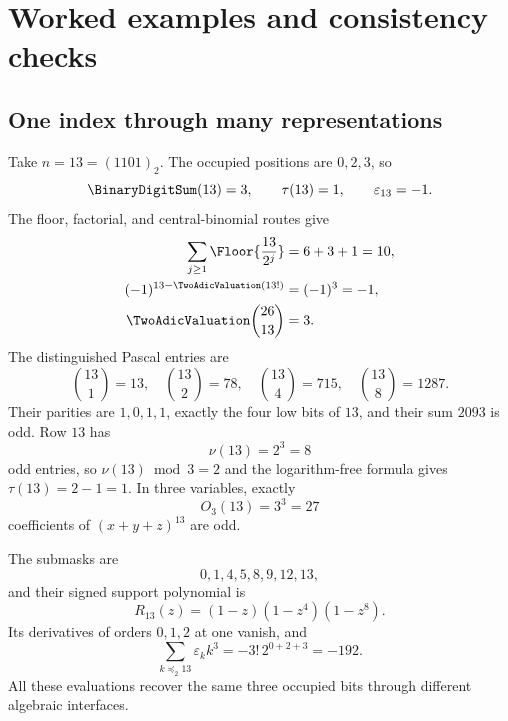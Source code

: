 \documentclass[11pt,oneside]{article}
\numberwithin{equation}{section}
\theoremstyle{definition}
\theoremstyle{remark}
\newcommand{\eps}{\varepsilon}
\newcommand{\submask}{\mathrel{\preccurlyeq_2}}
\begin{document}
\section[Worked examples]{Worked examples and consistency checks}
\label{p1:sec:worked-examples}

\subsection{One index through many representations}

Take \(n=13=(1101)_2\).  The occupied positions are \(0,2,3\), so
\begin{equation}
  \BinaryDigitSum(13)=3,
  \qquad
  \tau(13)=1,
  \qquad
  \eps_{13}=-1.
  \label{p1:eq:example13-basic}
\end{equation}
The floor, factorial, and central-binomial routes give
\begin{align}
 \sum_{j\ge1}\Floor{\frac{13}{2^j}}
 &=6+3+1=10,
 \label{p1:eq:example13-floor}\\
 (-1)^{13-\TwoAdicValuation(13!)}&=(-1)^3=-1,
 \label{p1:eq:example13-factorial}\\
 \TwoAdicValuation\binom{26}{13}&=3.
 \label{p1:eq:example13-central}
\end{align}
The distinguished Pascal entries are
\begin{equation}
 \binom{13}{1}=13,
 \quad
 \binom{13}{2}=78,
 \quad
 \binom{13}{4}=715,
 \quad
 \binom{13}{8}=1287.
 \label{p1:eq:example13-probes}
\end{equation}
Their parities are \(1,0,1,1\), exactly the four low bits of \(13\), and their
sum \(2093\) is odd.  Row \(13\) has
\begin{equation}
  \nu(13)=2^3=8
  \label{p1:eq:example13-odd-count}
\end{equation}
odd entries, so \(\nu(13)\bmod3=2\) and the logarithm-free formula gives
\(\tau(13)=2-1=1\).  In three variables, exactly
\begin{equation}
  O_3(13)=3^3=27
  \label{p1:eq:example13-multinomial}
\end{equation}
coefficients of \((x+y+z)^{13}\) are odd.

The submasks are
\begin{equation}
  0,1,4,5,8,9,12,13,
  \label{p1:eq:example13-submasks}
\end{equation}
and their signed support polynomial is
\begin{equation}
  R_{13}(z)=(1-z)(1-z^4)(1-z^8).
  \label{p1:eq:example13-support-product}
\end{equation}
Its derivatives of orders \(0,1,2\) at one vanish, and
\begin{equation}
  \sum_{k\submask13}\eps_kk^3=-3!\,2^{0+2+3}=-192.
  \label{p1:eq:example13-sparse-moment}
\end{equation}
All these evaluations recover the same three occupied bits through different
algebraic interfaces.
\end{document}
